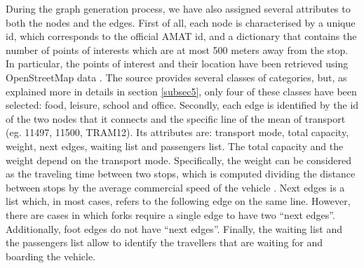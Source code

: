 During the graph generation process, we have also assigned several attributes to both the nodes and the edges. First of all, each node is characterised by a unique id, which corresponds to the official AMAT id, and a dictionary that contains the number of points of interests which are at most 500 meters away from the stop. In particular, the points of interest and their location have been retrieved using OpenStreetMap data \cite{site9}. The source provides several classes of categories, but, as explained more in details in section \ref{subsec5}, only four of these classes have been selected: food, leisure, school and office. 
Secondly, each edge is identified by the id of the two nodes that it connects and the specific line of the mean of transport (eg. 11497, 11500, TRAM12). Its attributes are: transport mode, total capacity, weight, next edges, waiting list and passengers list. The total capacity \cite{site13,site14,site15,site16} and the weight depend on the transport mode. Specifically, the weight can be considered as the traveling time between two stops, which is computed dividing the distance between stops by the average commercial speed of the vehicle \cite{site17}. Next edges is a list which, in most cases, refers to the following edge on the same line. However, there are cases in which forks require a single edge to have two “next edges”. Additionally, foot edges do not have “next edges”. Finally, the waiting list and the passengers list allow to identify the travellers that are waiting for and boarding the vehicle. 


 
